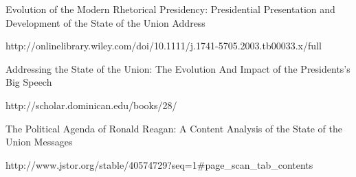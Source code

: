 Evolution of the Modern Rhetorical Presidency: Presidential Presentation and Development of the State of the Union Address

http://onlinelibrary.wiley.com/doi/10.1111/j.1741-5705.2003.tb00033.x/full

Addressing the State of the Union: The Evolution And Impact of the Presidents's Big Speech

http://scholar.dominican.edu/books/28/

The Political Agenda of Ronald Reagan: A Content Analysis of the State of the Union Messages

http://www.jstor.org/stable/40574729?seq=1#page_scan_tab_contents

